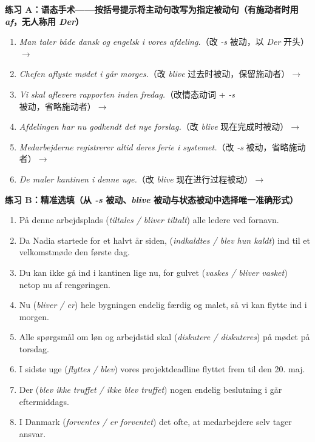 
\textbf{练习 A：语态手术——按括号提示将主动句改写为指定被动句（有施动者时用 \textit{af}，无人称用 \textit{Der}）}
\begin{enumerate}
  \item \textit{Man taler både dansk og engelsk i vores afdeling.}（改 \textit{-s} 被动，以 \textit{Der} 开头）$\rightarrow$
  \item \textit{Chefen aflyste mødet i går morges.}（改 \textit{blive} 过去时被动，保留施动者）$\rightarrow$
  \item \textit{Vi skal aflevere rapporten inden fredag.}（改情态动词 + \textit{-s} 被动，省略施动者）$\rightarrow$
  \item \textit{Afdelingen har nu godkendt det nye forslag.}（改 \textit{blive} 现在完成时被动）$\rightarrow$
  \item \textit{Medarbejderne registrerer altid deres ferie i systemet.}（改 \textit{-s} 被动，省略施动者）$\rightarrow$
  \item \textit{De maler kantinen i denne uge.}（改 \textit{blive} 现在进行过程被动）$\rightarrow$
\end{enumerate}

\textbf{练习 B：精准选填（从 \textit{-s} 被动、\textit{blive} 被动与状态被动中选择唯一准确形式）}
\begin{enumerate}
  \item På denne arbejdsplads \underline{\hspace{2.4cm}} (\textit{tiltales / bliver tiltalt}) alle ledere ved fornavn.
  \item Da Nadia startede for et halvt år siden, \underline{\hspace{2.4cm}} (\textit{indkaldtes / blev hun kaldt}) ind til et velkomstmøde den første dag.
  \item Du kan ikke gå ind i kantinen lige nu, for gulvet \underline{\hspace{2.4cm}} (\textit{vaskes / bliver vasket}) netop nu af rengøringen.
  \item Nu \underline{\hspace{2.4cm}} (\textit{bliver / er}) hele bygningen endelig færdig og malet, så vi kan flytte ind i morgen.
  \item Alle spørgsmål om løn og arbejdstid skal \underline{\hspace{2.4cm}} (\textit{diskutere / diskuteres}) på mødet på torsdag.
  \item I sidste uge \underline{\hspace{2.4cm}} (\textit{flyttes / blev}) vores projektdeadline flyttet frem til den 20. maj.
  \item Der \underline{\hspace{2.4cm}} (\textit{blev ikke truffet / ikke blev truffet}) nogen endelig beslutning i går eftermiddags.
  \item I Danmark \underline{\hspace{2.4cm}} (\textit{forventes / er forventet}) det ofte, at medarbejdere selv tager ansvar.
\end{enumerate}

